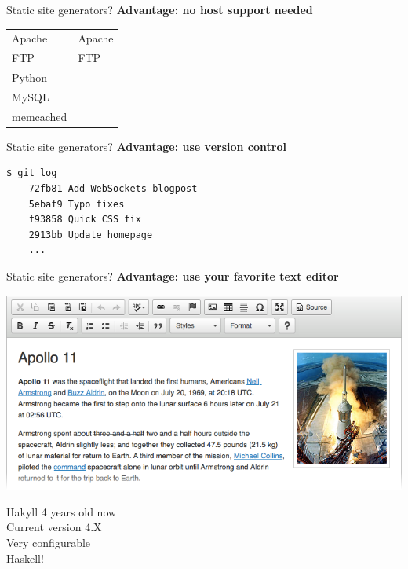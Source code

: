 \documentclass[20pt]{beamer}
\newcommand{\vspaced}{
    \vspace{5mm}
}
\begin{document}
\begin{frame}{Static site generators?}
    \textbf{Advantage: no host support needed} \\
    \vspaced
    \begin{center}
    \begin{tabular}{l|l}
    Apache    & Apache \\
    FTP       & FTP    \\
    Python    &        \\
    MySQL     &        \\
    memcached &        \\
    \end{tabular}
    \end{center}
\end{frame}

\begin{frame}[fragile]{Static site generators?}
    \textbf{Advantage: use version control} \\
    \vspaced
    \begin{lstlisting}[language=bash]
    $ git log
    72fb81 Add WebSockets blogpost
    5ebaf9 Typo fixes
    f93858 Quick CSS fix
    2913bb Update homepage
    ...
    \end{lstlisting}
\end{frame}

\begin{frame}{Static site generators?}
    \textbf{Advantage: use your favorite text editor} \\
    \vspaced
    \includegraphics[width=\textwidth]{images/wysiwyg.png}
\end{frame}


\begin{frame}{Hakyll}
    4 years old now \\
    Current version 4.X \\
    Very configurable \\
    Haskell! \\
\end{frame}
\end{document}

